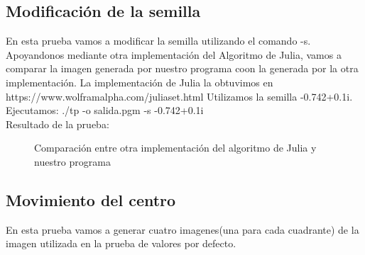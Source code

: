 \documentclass [12pt, a4paper]{article}
\begin{document}
	\subsection{Modificación de la semilla}
	En esta prueba vamos a modificar la semilla utilizando el comando -s. Apoyandonos mediante otra implementación del Algoritmo de Julia, vamos a comparar la imagen generada por nuestro programa coon la generada por la otra implementación. La implementación de Julia la obtuvimos en https://www.wolframalpha.com/juliaset.html
	Utilizamos la semilla  -0.742+0.1i.
	\\
	Ejecutamos: ./tp -o salida.pgm -s -0.742+0.1i\\
	Resultado de la prueba:
		\begin{figure}[h]
		\centering
		\caption{Comparación entre otra implementación del algoritmo de Julia y nuestro programa}
		\label{f:comparacion3}
	\end{figure}

	\subsection{Movimiento del centro}
	En esta prueba vamos a generar cuatro imagenes(una para cada cuadrante) de la imagen utilizada en la prueba de valores por defecto.
	
\end{document}
